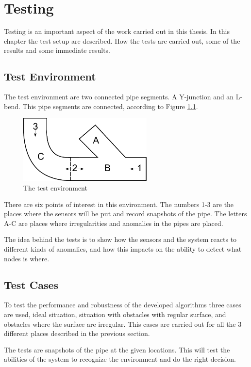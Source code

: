 \chapter{Testing}
\label{chap7}
Testing is an important aspect of the work carried out in this thesis. In this chapter the
test setup are described. How the tests are carried out, some of the results and some
immediate results.


\section{Test Environment}
The test environment are two connected pipe segments. A Y-junction and an L-bend. This
pipe segments are connected, according to Figure \ref{chap7:fig-environment}.
\begin{figure}[htbp]
    \centering
    \includegraphics[width=0.6\textwidth]{pics/test-environment}
    \caption{The test environment}
    \label{chap7:fig-environment}
\end{figure}

There are six points of interest in this environment. 
The numbers 1-3 are the places where the sensors will be put and record snapshots of the pipe. 
The letters A-C are places where irregularities and anomalies in the pipes are placed. 

The idea behind the tests is to show how the sensors and the system reacts to different
kinds of anomalies, and how this impacts on the ability to detect what nodes is where. 


\section{Test Cases}
To test the performance and robustness of the developed algorithms three cases are used,
ideal situation, situation with obstacles with regular surface, and obstacles where the
surface are irregular. This cases are carried out for all the 3 different places described
in the previous section.

The tests are snapshots of the pipe at the given locations. This will test the abilities
of the system to recognize the environment and do the right decision. 


